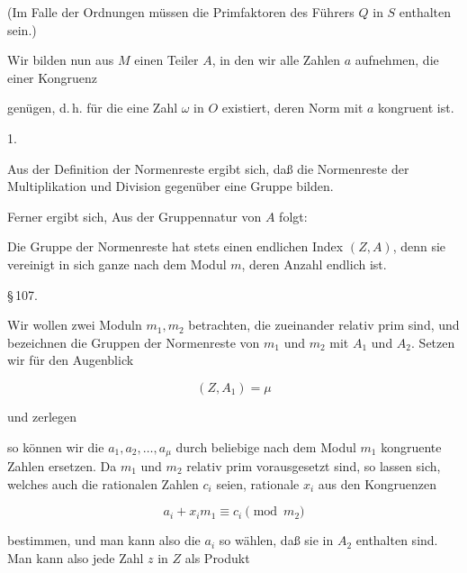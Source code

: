  (Im Falle der Ordnungen müssen die Primfaktoren des Führers $Q$ in $S$ enthalten sein.)

Wir bilden nun aus $M$ einen Teiler $A$, in den wir alle Zahlen $a$ aufnehmen, die einer Kongruenz


genügen, d.\,h. für die eine Zahl $\omega$ in $O$ existiert, deren Norm mit $a$ kongruent ist.

1. 

Aus der Definition der Normenreste ergibt sich, daß die Normenreste der Multiplikation und Division gegenüber eine Gruppe bilden.

Ferner ergibt sich,  Aus der Gruppennatur von $A$ folgt:



Die Gruppe der Normenreste hat stets einen endlichen Index $(Z, A)$, denn sie vereinigt in sich ganze  nach dem Modul $m$, deren Anzahl endlich ist.

\S\,107. 

Wir wollen zwei Moduln $m_1, m_2$ betrachten, die zueinander relativ prim sind, und bezeichnen die Gruppen der Normenreste von $m_1$ und $m_2$ mit $A_1$ und $A_2$. Setzen wir für den Augenblick

\[ (Z, A_1) = \mu \]

und zerlegen


so können wir die $a_1, a_2, \ldots, a_\mu$ durch beliebige nach dem Modul $m_1$ kongruente Zahlen ersetzen. Da $m_1$ und $m_2$ relativ prim vorausgesetzt sind, so lassen sich, welches auch die rationalen Zahlen $c_i$ seien, rationale $x_i$ aus den Kongruenzen

\[ a_i + x_i m_1 \equiv c_i \pmod{m_2} \]

bestimmen, und man kann also die $a_i$ so wählen, daß sie in $A_2$ enthalten sind. Man kann also jede Zahl $z$ in $Z$ als Produkt
